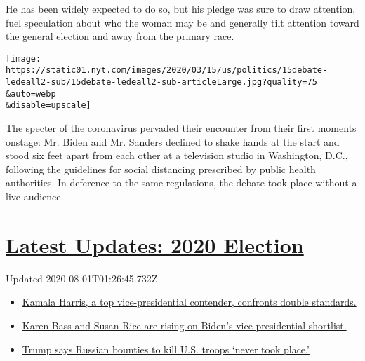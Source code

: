 He has been widely expected to do so, but his pledge was sure to draw
attention, fuel speculation about who the woman may be and generally
tilt attention toward the general election and away from the primary
race.

\texttt{[image: https://static01.nyt.com/images/2020/03/15/us/politics/15debate-ledeall2-sub/15debate-ledeall2-sub-articleLarge.jpg?quality=75\\\&auto=webp\\\&disable=upscale]}

The specter of the coronavirus pervaded their encounter from their first
moments onstage: Mr. Biden and Mr. Sanders declined to shake hands at
the start and stood six feet apart from each other at a television
studio in Washington, D.C., following the guidelines for social
distancing prescribed by public health authorities. In deference to the
same regulations, the debate took place without a live audience.

\hypertarget{latest-updates-2020-election}{%
\section{\texorpdfstring{\href{https://www.nytimes.com/2020/07/31/us/elections/biden-vs-trump.html?action=click\&pgtype=Article\&state=default\&region=MAIN_CONTENT_1\&context=storylines_live_updates}{Latest
Updates: 2020
Election}}{Latest Updates: 2020 Election}}\label{latest-updates-2020-election}}

Updated 2020-08-01T01:26:45.732Z

\begin{itemize}
\tightlist
\item
  \href{https://www.nytimes.com/2020/07/31/us/elections/biden-vs-trump.html?action=click\&pgtype=Article\&state=default\&region=MAIN_CONTENT_1\&context=storylines_live_updates\#link-29fdff45}{Kamala
  Harris, a top vice-presidential contender, confronts double
  standards.}
\item
  \href{https://www.nytimes.com/2020/07/31/us/elections/biden-vs-trump.html?action=click\&pgtype=Article\&state=default\&region=MAIN_CONTENT_1\&context=storylines_live_updates\#link-13ec3d9c}{Karen
  Bass and Susan Rice are rising on Biden's vice-presidential
  shortlist.}
\item
  \href{https://www.nytimes.com/2020/07/31/us/elections/biden-vs-trump.html?action=click\&pgtype=Article\&state=default\&region=MAIN_CONTENT_1\&context=storylines_live_updates\#link-49e9a016}{Trump
  says Russian bounties to kill U.S. troops `never took place.'}
\end{itemize}

